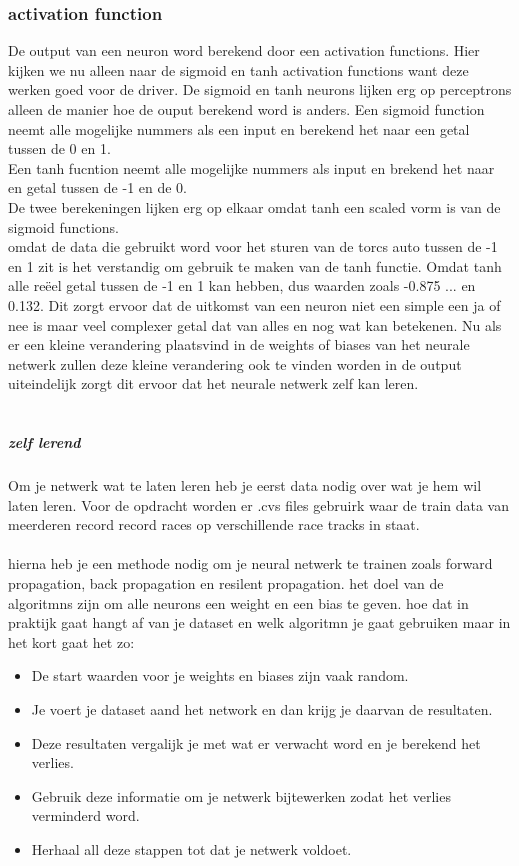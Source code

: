 \subsubsection{activation function}
De output van een neuron word berekend door een activation functions. Hier kijken we nu alleen naar de sigmoid en tanh activation functions want deze werken goed voor de driver. %
De sigmoid en tanh neurons lijken erg op perceptrons alleen de manier hoe de ouput berekend word is anders. Een sigmoid function neemt alle mogelijke nummers als een input en berekend het naar een getal tussen de 0 en 1.\\
Een tanh fucntion neemt alle mogelijke nummers als input en brekend het naar en getal tussen de -1 en de 0.\\
De twee berekeningen lijken erg op elkaar omdat tanh een scaled vorm is van de sigmoid functions.\\
omdat de data die gebruikt word voor het sturen van de torcs auto tussen de -1 en 1 zit is het verstandig om gebruik te maken van de tanh functie. Omdat tanh alle reëel getal tussen de -1 en 1 kan hebben, dus waarden zoals -0.875 ... en 0.132. Dit zorgt ervoor dat de uitkomst van een neuron niet een simple een ja of nee is maar veel complexer getal dat van alles en nog wat kan betekenen. Nu als er een kleine verandering plaatsvind in de weights of biases van het neurale netwerk zullen deze kleine verandering ook te vinden worden in de output uiteindelijk zorgt dit ervoor dat het neurale netwerk zelf kan leren.\\\\
\subparagraph{zelf lerend}
Om je netwerk wat te laten leren heb je eerst data nodig over wat je hem wil laten leren. Voor de opdracht worden er .cvs files gebruirk waar de train data van meerderen record record races op verschillende race tracks in staat.\\\\
\noindent hierna heb je een methode nodig om je neural netwerk te trainen zoals forward propagation, back propagation en resilent propagation. het doel van de algoritmns zijn om alle neurons een weight en een bias te geven. hoe dat in praktijk gaat hangt af van je dataset en welk algoritmn je gaat gebruiken maar in het kort gaat het zo:
\begin{itemize}
\item De start waarden voor je weights en biases zijn vaak random.
\item Je voert je dataset aand het network en dan krijg je daarvan de resultaten.
\item Deze resultaten vergalijk je met wat er verwacht word en je berekend het verlies.
\item Gebruik deze informatie om je netwerk bijtewerken zodat het verlies verminderd word.
\item Herhaal all deze stappen tot dat je netwerk voldoet.
\end{itemize}

